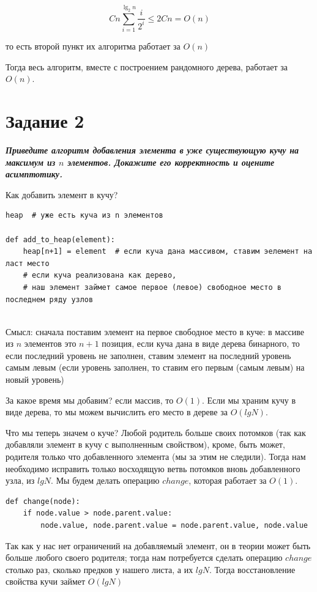 \documentclass{article}
\begin{document}
$$Cn   \sum_{i = 1}^{\lg_2 n}  \frac{i}{2^i} \leq 2Cn = O(n)$$

то есть второй пункт их алгоритма работает за $O(n)$

Тогда весь алгоритм, вместе с построением рандомного дерева, работает за $O(n)$.


\bigskip

\section*{\textbf{Задание 2}} \textbf{\textit{Приведите алгоритм добавления элемента в уже существующую кучу на максимум из $n$ элементов. Докажите его корректность и оцените асимптотику.}}

Как добавить элемент в кучу?

\begin{verbatim}
heap  # уже есть куча из n элементов

def add_to_heap(element):
    heap[n+1] = element  # если куча дана массивом, ставим эелемент на ласт место
    # если куча реализована как дерево, 
    # наш элемент займет самое первое (левое) свободное место в последнем ряду узлов
    
\end{verbatim}

Смысл: сначала поставим элемент на первое свободное место в куче: в массиве из $n$ элементов это $n+1$ позиция, если куча дана в виде дерева бинарного, то если последний уровень не заполнен, ставим элемент на последний уровень самым левым (если уровень заполнен, то ставим его первым (самым левым) на новый уровень)

За какое время мы добавим? если массив, то $O(1)$. Если мы храним кучу в виде дерева, то мы можем вычислить его место в дереве за $O(lgN)$. 

Что мы теперь значем о куче? Любой родитель больше своих потомков (так как добавляли элемент в кучу с выполненным свойством), кроме, быть может, родителя только что добавленного элемента (мы за этим не следили). Тогда нам необходимо исправить только восходящую ветвь потомков вновь добавленного узла, из $lgN$. Мы будем делать операцию $change$, которая работает за $O(1)$.

\begin{verbatim}
def change(node):
    if node.value > node.parent.value:
        node.value, node.parent.value = node.parent.value, node.value 
\end{verbatim}

Так как у нас нет ограничений на добавляемый элемент, он в теории может быть больше любого своего родителя; тогда нам потребуется сделать операцию $change$ столько раз, сколько предков у нашего листа, а их $lgN$. Тогда восстановление свойства кучи займет $O(lgN)$
\end{document}
